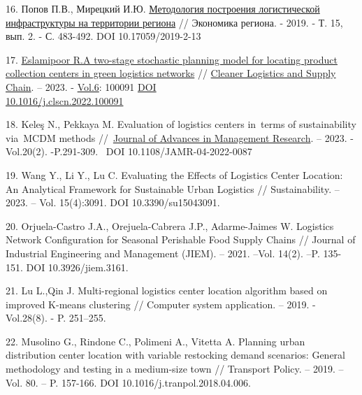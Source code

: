 \begin{references}
16. Попов П.В., Мирецкий И.Ю.
\href{https://economyofregion.ru/arhiv/2019-2/nomer-2-2019/metodologiya-postroeniya-logisticheskoj-infrastruktury-na-territorii-regiona/}{Методология
построения логистической инфраструктуры на территории региона} //
Экономика региона. - 2019. - Т. 15, вып. 2. - С. 483-492. DOI
10.17059/2019-2-13

17. \href{https://www.scopus.com/authid/detail.uri?origin=resultslist&authorId=55624611200&zone=}{Eslamipoor
R.}\href{https://www.scopus.com/record/display.uri?eid=2-s2.0-85146138004&origin=resultslist&sort=plf-f&src=s&st1=logistics+center&sid=608c0e84c46c21631ea70ffcaa21b2a6&sot=b&sdt=b&sl=23&s=TITLE\%28logistics+center\%29&relpos=0&citeCnt=0&searchTerm=}{A
two-stage stochastic planning model for locating product collection
centers in green logistics networks} //
\href{https://www.scopus.com/sourceid/21101098869?origin=resultslist}{Cleaner
Logistics and Supply Chain}. -- 2023. -
\href{https://www.sciencedirect.com/journal/cleaner-logistics-and-supply-chain/vol/6/suppl/C}{Vol.6}:
100091 \href{https://doi.org/10.1016/j.clscn.2022.100091}{DOI\\
10.1016/j.clscn.2022.100091}

18. Keleş N., Pekkaya M. Evaluation of logistics centers in~terms of
sustainability via~MCDM methods
//~\href{https://www.emerald.com/insight/publication/issn/0972-7981}{Journal
of Advances in Management Research}. -- 2023. - Vol.20(2).
-P.291-309.~ DOI 10.1108/JAMR-04-2022-0087

19. Wang Y., Li Y., Lu C. Evaluating the Effects of Logistics Center
Location: An Analytical Framework for Sustainable Urban Logistics //
Sustainability. -- 2023. -- Vol. 15(4):3091. DOI 10.3390/su15043091.

20. Orjuela-Castro J.A., Orejuela-Cabrera J.P., Adarme-Jaimes W. Logistics
Network Configuration for Seasonal Perishable Food Supply Chains //
Journal of Industrial Engineering and Management (JIEM). -- 2021.
--Vol. 14(2). --P. 135-151. DOI 10.3926/jiem.3161.

21. Lu L.,Qin J. Multi-regional logistics center location algorithm based
on improved K-means clustering // Computer system application. --
2019. - Vol.28(8). - P. 251--255.

22. Musolino G., Rindone C., Polimeni A., Vitetta A. Planning urban
distribution center location with variable restocking demand
scenarios: General methodology and testing in a medium-size town //
Transport Policy. -- 2019. --Vol. 80. -- P. 157-166. DOI
10.1016/j.tranpol.2018.04.006.


\end{references}
